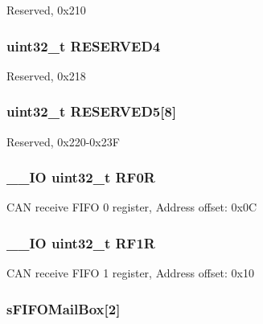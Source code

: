 Reserved, 0x210 \hypertarget{struct_c_a_n___type_def_ac0018930ee9f18afda25b695b9a4ec16}{
\subsubsection[{R\-E\-S\-E\-R\-V\-E\-D4}]{\setlength{\rightskip}{0pt plus 5cm}uint32\-\_\-t R\-E\-S\-E\-R\-V\-E\-D4}}\label{struct_c_a_n___type_def_ac0018930ee9f18afda25b695b9a4ec16}
Reserved, 0x218 \hypertarget{struct_c_a_n___type_def_a269f31b91d0f38a48061b76ecc346f55}{
\subsubsection[{R\-E\-S\-E\-R\-V\-E\-D5}]{\setlength{\rightskip}{0pt plus 5cm}uint32\-\_\-t R\-E\-S\-E\-R\-V\-E\-D5\mbox{[}8\mbox{]}}}\label{struct_c_a_n___type_def_a269f31b91d0f38a48061b76ecc346f55}
Reserved, 0x220-\/0x23\-F \hypertarget{struct_c_a_n___type_def_accf4141cee239380d0ad4634ee21dbf6}{
\subsubsection[{R\-F0\-R}]{\setlength{\rightskip}{0pt plus 5cm}\-\_\-\-\_\-\-I\-O uint32\-\_\-t R\-F0\-R}}\label{struct_c_a_n___type_def_accf4141cee239380d0ad4634ee21dbf6}
C\-A\-N receive F\-I\-F\-O 0 register, Address offset\-: 0x0\-C \hypertarget{struct_c_a_n___type_def_a02b589bb589df4f39e549dca4d5abb08}{
\subsubsection[{R\-F1\-R}]{\setlength{\rightskip}{0pt plus 5cm}\-\_\-\-\_\-\-I\-O uint32\-\_\-t R\-F1\-R}}\label{struct_c_a_n___type_def_a02b589bb589df4f39e549dca4d5abb08}
C\-A\-N receive F\-I\-F\-O 1 register, Address offset\-: 0x10 \hypertarget{struct_c_a_n___type_def_a21b030b34e131f7ef6ea273416449fe4}{
\subsubsection[{s\-F\-I\-F\-O\-Mail\-Box}]{ s\-F\-I\-F\-O\-Mail\-Box\mbox{[}2\mbox{]}}}\label{struct_c_a_n___type_def_a21b030b34e131f7ef6ea273416449fe4}
